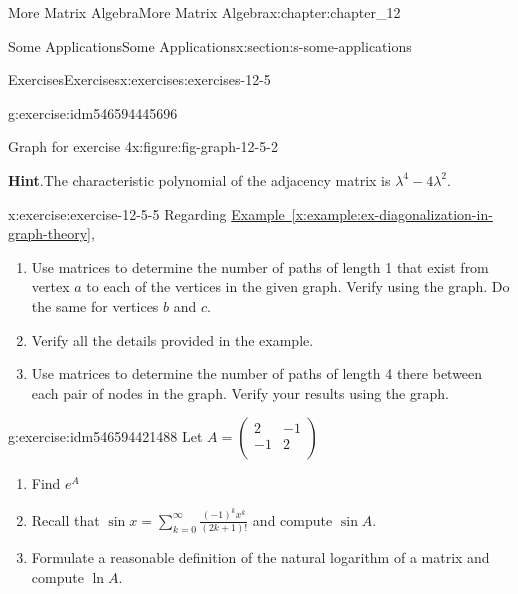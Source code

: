 \documentclass[oneside,10pt,]{book}
\newcommand{\blocktitlefont}{\relax}
\newcommand{\xreffont}{\relax}
\numberwithin{equation}{section}
\begin{document}
\begin{chapterptx}{More Matrix Algebra}{}{More Matrix Algebra}{}{}{x:chapter:chapter_12}
\begin{sectionptx}{Some Applications}{}{Some Applications}{}{}{x:section:s-some-applications}
\begin{exercises-subsection}{Exercises}{}{Exercises}{}{}{x:exercises:exercises-12-5}
\begin{divisionexercise}{4}{}{}{g:exercise:idm546594445696}
\begin{figureptx}{Graph for exercise 4}{x:figure:fig-graph-12-5-2}{}
\begin{image}{0.15}{0.7}{0.15}
\end{image}%
\tcblower
\end{figureptx}%
\par\smallskip%
\noindent\textbf{\blocktitlefont Hint}.\hypertarget{g:hint:idm546594442448}{}\quad{}The characteristic polynomial of the adjacency matrix is \(\lambda ^4 - 4 \lambda^2\).%
\end{divisionexercise}%
\begin{divisionexercise}{5}{}{}{x:exercise:exercise-12-5-5}%
Regarding \hyperref[x:example:ex-diagonalization-in-graph-theory]{Example~{\xreffont\ref{x:example:ex-diagonalization-in-graph-theory}}},%
\begin{enumerate}[label=(\alph*)]
\item{}Use matrices to determine the number of paths of length 1 that exist from vertex \(a\) to each of the vertices in the given graph. Verify using the graph. Do the same for vertices \(b\) and \(c\).%
\item{}Verify all the details provided in the example.%
\item{}Use matrices to determine the number of paths of length 4 there between each pair of nodes in the graph. Verify your results using the graph.%
\end{enumerate}
%
\end{divisionexercise}%
\begin{divisionexercise}{6}{}{}{g:exercise:idm546594421488}%
Let \(A =\left(
\begin{array}{cc}
2 & -1 \\
-1 & 2 \\
\end{array}
\right)\)%
\begin{enumerate}[label=(\alph*)]
\item{}Find \(e^A\)%
\item{}Recall that \(\sin  x = \sum _{k=0}^{\infty } \frac{(-1)^k x^k}{(2 k+1)!}\)  and compute \(\sin  A\).%
\item{}Formulate a reasonable definition of the natural logarithm of a matrix and compute \(\ln  A\).%
\end{enumerate}
%
\end{divisionexercise}%
\end{exercises-subsection}
\end{sectionptx}
\end{chapterptx}
\end{document}
